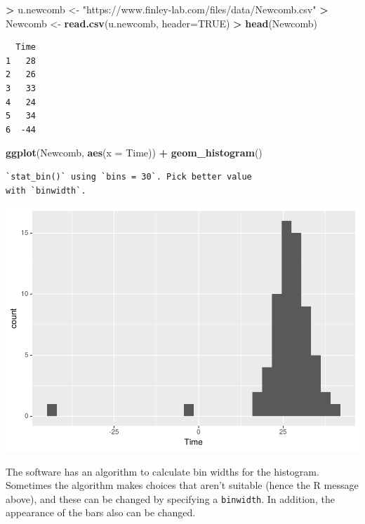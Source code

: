 \documentclass[
]{krantz}
\makeatletter
\newenvironment{Shaded}{\begin{snugshade}}{\end{snugshade}}
\newcommand{\DataTypeTok}[1]{\textcolor[rgb]{0.27,0.27,0.27}{#1}}
\newcommand{\KeywordTok}[1]{\textcolor[rgb]{0.27,0.27,0.27}{\textbf{#1}}}
\newcommand{\NormalTok}[1]{#1}
\newcommand{\OperatorTok}[1]{\textcolor[rgb]{0.43,0.43,0.43}{\textbf{#1}}}
\newcommand{\OtherTok}[1]{\textcolor[rgb]{0.37,0.37,0.37}{#1}}
\newcommand{\StringTok}[1]{\textcolor[rgb]{0.5,0.5,0.5}{#1}}
\newenvironment{kframe}{%
\medskip{}
\setlength{\fboxsep}{.8em}
 \def\at@end@of@kframe{}%
 \ifinner\ifhmode%
  \def\at@end@of@kframe{\end{minipage}}%
  \begin{minipage}{\columnwidth}%
 \fi\fi%
 \def\FrameCommand##1{\hskip\@totalleftmargin \hskip-\fboxsep
 \colorbox{shadecolor}{##1}\hskip-\fboxsep
     \hskip-\linewidth \hskip-\@totalleftmargin \hskip\columnwidth}%
 \MakeFramed {\advance\hsize-\width
   \@totalleftmargin\z@ \linewidth\hsize
   \@setminipage}}%
 {\par\unskip\endMakeFramed%
 \at@end@of@kframe}
\renewenvironment{Shaded}{\begin{kframe}}{\end{kframe}}
\makeatother
\begin{document}
\begin{Shaded}
\begin{Highlighting}[]
\OperatorTok{\textgreater{}}\StringTok{ }\NormalTok{u.newcomb \textless{}{-}}\StringTok{ "https://www.finley{-}lab.com/files/data/Newcomb.csv"}
\OperatorTok{\textgreater{}}\StringTok{ }\NormalTok{Newcomb \textless{}{-}}\StringTok{ }\KeywordTok{read.csv}\NormalTok{(u.newcomb, }\DataTypeTok{header=}\OtherTok{TRUE}\NormalTok{)}
\OperatorTok{\textgreater{}}\StringTok{ }\KeywordTok{head}\NormalTok{(Newcomb)}
\end{Highlighting}
\end{Shaded}

\begin{verbatim}
  Time
1   28
2   26
3   33
4   24
5   34
6  -44
\end{verbatim}

\begin{Shaded}
\begin{Highlighting}[]
\KeywordTok{ggplot}\NormalTok{(Newcomb, }\KeywordTok{aes}\NormalTok{(}\DataTypeTok{x =}\NormalTok{ Time)) }\OperatorTok{+}\StringTok{ }\KeywordTok{geom\_histogram}\NormalTok{()}
\end{Highlighting}
\end{Shaded}

\begin{verbatim}
`stat_bin()` using `bins = 30`. Pick better value
with `binwidth`.
\end{verbatim}

\includegraphics{bookdown_files/figure-latex/unnamed-chunk-75-1.pdf}

The software has an algorithm to calculate bin widths for the histogram. Sometimes the algorithm makes choices that aren't suitable (hence the R message above), and these can be changed by specifying a \texttt{binwidth}. In addition, the appearance of the bars also can be changed.
\end{document}
